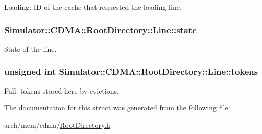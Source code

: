 Loading\+: I\+D of the cache that requested the loading line. 

\hypertarget{struct_simulator_1_1_c_d_m_a_1_1_root_directory_1_1_line_a3312c09855e3fa9f551cd71f6d041e28}{
\subsubsection[{state}]{ Simulator\+::\+C\+D\+M\+A\+::\+Root\+Directory\+::\+Line\+::state}}\label{struct_simulator_1_1_c_d_m_a_1_1_root_directory_1_1_line_a3312c09855e3fa9f551cd71f6d041e28}


State of the line. 

\hypertarget{struct_simulator_1_1_c_d_m_a_1_1_root_directory_1_1_line_a6bb45639be5d1a1b3744d519fe31117c}{
\subsubsection[{tokens}]{\setlength{\rightskip}{0pt plus 5cm}unsigned int Simulator\+::\+C\+D\+M\+A\+::\+Root\+Directory\+::\+Line\+::tokens}}\label{struct_simulator_1_1_c_d_m_a_1_1_root_directory_1_1_line_a6bb45639be5d1a1b3744d519fe31117c}


Full\+: tokens stored here by evictions. 



The documentation for this struct was generated from the following file\+:\begin{DoxyCompactItemize}
\item 
arch/mem/cdma/\hyperlink{cdma_2_root_directory_8h}{Root\+Directory.\+h}\end{DoxyCompactItemize}
